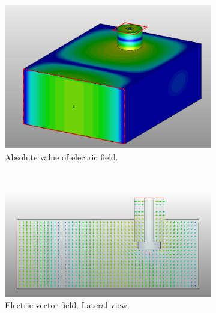 \documentclass[english,twoside]{article}
\begin{document}
		\newpage
		\begin{landscape}
			\begin{figure}
				\centering
				\begin{subfigure}[b]{0.5\textwidth}
					\includegraphics[width=\textwidth]{figures/coaxToWaveguide_abs}
					\caption{Absolute value of electric field.}
				\end{subfigure}
				~ %
				\begin{subfigure}[b]{0.5\textwidth}
					\includegraphics[width=\textwidth]{figures/coaxToWaveguide_lateral}
					\caption{Electric vector field. Lateral view.}
				\end{subfigure}
				\vspace{10pt}\newline
				~ %
				\begin{subfigure}[b]{.7\textwidth}

\end{subfigure}
\end{figure}
\end{landscape}
\end{document}
